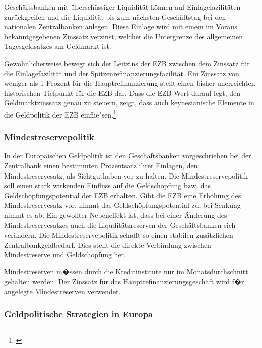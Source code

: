 \documentclass[
        onecolumn,
        a4paper,
        abstracton,
        parskip=half
        ,final
        ]{scrartcl}
\begin{document}
Gesch{\"a}ftsbanken mit {\"u}bersch{\"u}ssiger Liquidit{\"a}t  k{\"o}nnen auf Einlagefazilit{\"a}ten zur{\"u}ckgreifen und die Liquidit{\"a}t bis zum n{\"a}chsten Gesch{\"a}ftstag bei den nationalen Zentralbanken anlegen. Diese Einlage wird mit einem im Voraus bekanntgegebenen Zinssatz verzinst, welcher die Untergrenze des allgemeinen Tagesgeldsatzes am Geldmarkt ist.

Gew{\"o}hnlicherweise bewegt sich der Leitzins der EZB zwischen dem Zinssatz f{\"u}r die Einlagefazilit{\"a}t und der Spitzenrefinanzierungsfazilit{\"a}t. Ein Zinssatz von weniger als 1 Prozent f{\"u}r die Hauptrefinanzierung stellt einen bisher unerreichten historischen Tiefpunkt f{\"u}r die EZB dar.
Dass die EZB Wert darauf legt, den Geldmarktzinssatz genau zu steuern, zeigt, dass auch keynesianische Elemente in die Geldpolitik der EZB einflie{"s}en.\footnote[59]{\citep*[vgl.][S.562f]{Basseler2010}}

\subsubsection{Mindestreservepolitik}   %
In der Europ{\"a}ischen Geldpolitik ist den Gesch{\"a}ftsbanken vorgeschrieben bei der Zentralbank einen bestimmten Prozentsatz ihrer Einlagen, den Mindestreservesatz, als Sichtguthaben vor zu halten. Die Mindestreservepolitik\citep*[vgl.][S.562f]{Basseler2010} soll einen stark wirkenden Einfluss auf die Geldsch{\"o}pfung bzw. das Geldsch{\"o}pfungspotential der EZB erhalten. Gibt die EZB eine Erh{\"o}hung des Mindestreservesatz vor, nimmt das Geldsch{\"o}pfungspotential zu, bei Senkung nimmt es ab.
Ein gewollter Nebeneffekt ist, dass bei einer {\"A}nderung des Mindestreservesatzes auch die Liqudit{\"a}tsreserven der Gesch{\"a}ftsbanken sich ver{\"a}ndern.
Die Mindestreservepolitik schafft so einen stabilen zus{\"a}tzlichen Zentralbankgeldbedarf. Dies stellt die direkte Verbindung zwischen Mindestreserve und Geldsch{\"o}pfung her.

Mindestreserven m�ssen durch die Kreditinstitute nur im Monatsdurchschnitt gehalten werden. Der Zinssatz f{\"u}r das Hauptrefinanzierungsgesch{\"a}ft wird f�r angelegte Mindestreserven verwendet.

\subsubsection{Geldpolitische Strategien in Europa}
\end{document}

